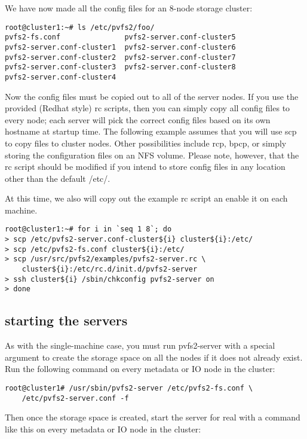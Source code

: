 \documentclass[11pt, letterpaper]{article}
\begin{document}
We have now made all the config files for an 8-node storage cluster:
\begin{verbatim}
root@cluster1:~# ls /etc/pvfs2/foo/
pvfs2-fs.conf               pvfs2-server.conf-cluster5
pvfs2-server.conf-cluster1  pvfs2-server.conf-cluster6
pvfs2-server.conf-cluster2  pvfs2-server.conf-cluster7
pvfs2-server.conf-cluster3  pvfs2-server.conf-cluster8
pvfs2-server.conf-cluster4
\end{verbatim}

Now the config files must be copied out to all of the server nodes.  If you 
use the provided (Redhat style) rc scripts, then you can simply copy all
config files to every node; each server will pick the correct config files
based on its own hostname at startup time.  The following example assumes
that you will use scp to copy files to cluster nodes.  Other possibilities
include rcp, bpcp, or simply storing the configuration files on an NFS volume.
Please note, however, that the rc script should be modified if you intend
to store config files in any location other than the default /etc/.

At this time, we also will copy out the example rc script an enable it on
each machine.

\begin{verbatim}
root@cluster1:~# for i in `seq 1 8`; do
> scp /etc/pvfs2-server.conf-cluster${i} cluster${i}:/etc/
> scp /etc/pvfs2-fs.conf cluster${i}:/etc/
> scp /usr/src/pvfs2/examples/pvfs2-server.rc \
    cluster${i}:/etc/rc.d/init.d/pvfs2-server
> ssh cluster${i} /sbin/chkconfig pvfs2-server on
> done
\end{verbatim}

\subsection{starting the servers}

As with the single-machine case, you must run pvfs2-server with a special
argument to create the storage space on all the nodes if it does not already
exist.  Run the following command on every metadata or IO node in the cluster:

\begin{verbatim}
root@cluster1# /usr/sbin/pvfs2-server /etc/pvfs2-fs.conf \
	/etc/pvfs2-server.conf -f
\end{verbatim}

Then once the storage space is created, start the server for real with a
command like this on every metadata or IO node in the cluster:
\end{document}
